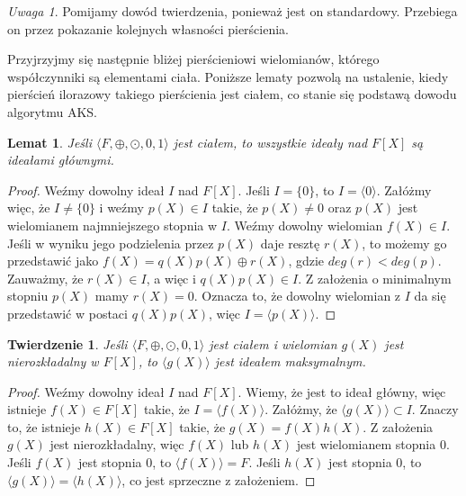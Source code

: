 \documentclass[declaration,shortabstract]{iithesis}
\theoremstyle{definition}
\theoremstyle{remark} \newtheorem{observation}{Obserwacja}
\theoremstyle{plain} \newtheorem{theorem}{Twierdzenie}
\theoremstyle{plain} \newtheorem{lemma}{Lemat}
\theoremstyle{remark} \newtheorem*{remark*}{Uwaga}
\theoremstyle{reminder} \newtheorem*{reminder*}{Przypomnienie}
\begin{document}
\begin{remark*}
    Pomijamy dowód twierdzenia, ponieważ jest on standardowy. Przebiega on przez pokazanie kolejnych własności pierścienia.
\end{remark*}

Przyjrzyjmy się następnie bliżej pierścieniowi wielomianów, którego współczynniki są elementami ciała. Poniższe lematy pozwolą na ustalenie, kiedy pierścień ilorazowy takiego pierścienia jest ciałem, co stanie się podstawą dowodu algorytmu AKS.

\begin{lemma}\label{idealy_glowne0}
	Jeśli $\langle F, \oplus, \odot, 0, 1 \rangle$ jest ciałem, to wszystkie ideały nad $F[X]$ są ideałami głównymi.
\end{lemma}

\begin{proof}
    Weźmy dowolny ideał $I$ nad $F[X]$. Jeśli $I = \{0\}$, to $I = \langle0\rangle$. Załóżmy więc, że $I \neq \{0\}$ i weźmy $p(X) \in I$ takie, że $p(X) \neq 0$ oraz $p(X)$ jest wielomianem najmniejszego stopnia w $I$. Weźmy dowolny wielomian $f(X) \in I$. Jeśli w wyniku jego podzielenia przez $p(X)$ daje resztę $r(X)$, to możemy go przedstawić jako $f(X) = q(X)p(X) \oplus r(X)$, gdzie $deg(r) < deg(p)$. Zauważmy, że $r(X) \in I$, a więc i $q(X)p(X) \in I$. Z założenia o minimalnym stopniu $p(X)$ mamy $r(X) = 0$. Oznacza to, że dowolny wielomian z $I$ da się przedstawić w postaci $q(X)p(X)$, więc $I = \langle p(X) \rangle$. 
\end{proof}

\begin{theorem}
	Jeśli $\langle F, \oplus, \odot, 0, 1 \rangle$ jest ciałem i wielomian $g(X)$ jest nierozkładalny w $F[X]$, to $\langle g(X) \rangle$ jest ideałem maksymalnym.
\end{theorem}

\begin{proof}
	Weźmy dowolny ideał $I$ nad $F[X]$. Wiemy, że jest to ideał główny, więc istnieje $f(X) \in F[X]$ takie, że $I = \langle f(X) \rangle$. Załóżmy, że $\langle g(X) \rangle \subset I$. Znaczy to, że istnieje $h(X) \in F[X]$ takie, że $g(X) = f(X)h(X)$. Z założenia $g(X)$ jest nierozkładalny, więc $f(X)$ lub $h(X)$ jest wielomianem stopnia $0$. Jeśli $f(X)$ jest stopnia $0$, to $\langle f(X) \rangle = F$. Jeśli $h(X)$ jest stopnia $0$, to $\langle g(X) \rangle = \langle h(X) \rangle$, co jest sprzeczne z założeniem.
\end{proof}
\end{document}
